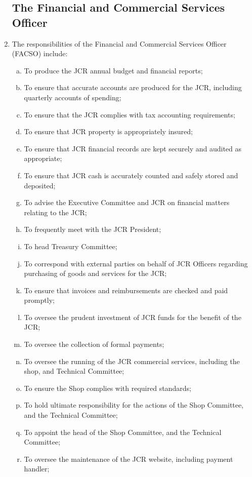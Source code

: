 \documentclass[12pt]{article}
\begin{document}
\begin{enumerate}
    \subsection{The Financial and Commercial Services Officer}
    \item The responsibilities of the Financial and Commercial Services Officer (FACSO) include:
    \begin{enumerate}[(a)]
        \item To produce the JCR annual budget and financial reports;
        \item To ensure that accurate accounts are produced for the JCR, including quarterly accounts of spending;
        \item To ensure that the JCR complies with tax accounting requirements;
        \item To ensure that JCR property is appropriately insured;
        \item To ensure that JCR financial records are kept securely and audited as appropriate;
        \item To ensure that JCR cash is accurately counted and safely stored and deposited;
        \item To advise the Executive Committee and JCR on financial matters relating to the JCR;
        \item To frequently meet with the JCR President;
        \item To head Treasury Committee;
        \item To correspond with external parties on behalf of JCR Officers regarding purchasing of goods and services for the JCR;
        \item To ensure that invoices and reimbursements are checked and paid promptly;
        \item To oversee the prudent investment of JCR funds for the benefit of the JCR;
        \item To oversee the collection of formal payments;
        \item To oversee the running of the JCR commercial services, including the shop, and Technical Committee;
        \item To ensure the Shop complies with required standards;
        \item To hold ultimate responsibility for the actions of the Shop Committee, and the Technical Committee;
        \item To appoint the head of the Shop Committee, and the Technical Committee;
        \item To oversee the maintenance of the JCR website, including payment handler;

\end{enumerate}
\end{enumerate}
\end{document}
